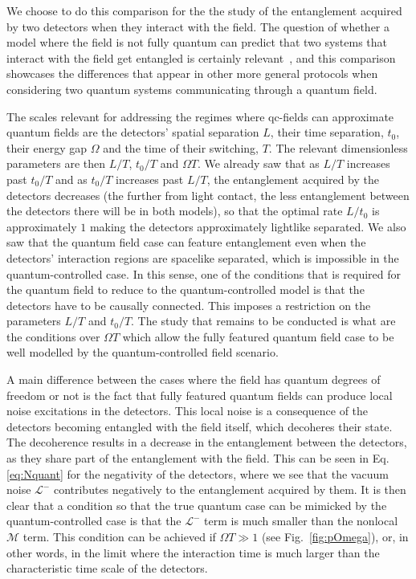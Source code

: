 \documentclass[letterpaper,12pt,titlepage,oneside,final]{book}
\begin{document}
We choose to do this comparison for the the study of the entanglement acquired by two detectors when they interact with the field. The question of whether a model where the field is not fully quantum can predict that two systems that interact with the field get entangled is certainly relevant~\cite{MVPRD2020}, and this comparison showcases the differences that appear in other more general protocols when considering two quantum systems communicating through a quantum field.


The scales relevant for addressing the regimes where qc-fields can approximate quantum fields are the detectors' spatial separation $L$, their time separation, $t_0$, their energy gap $\Omega$ and the time of their switching, $T$. The relevant dimensionless parameters are then $L/T$, $t_0/T$ and $\Omega T$. We already saw that as $L/T$ increases past $t_0/T$ and as $t_0/T$ increases past $L/T$, the entanglement acquired by the detectors decreases (the further from light contact, the less entanglement between the detectors there will be in both models), so that the optimal rate $L/t_0$ is approximately $1$ making the detectors approximately lightlike separated. We also saw that the quantum field case can feature entanglement even when the {detectors' interaction regions} are spacelike separated, which is impossible in the {quantum-controlled} case. {In this sense, one of the conditions that is required for the quantum field to reduce to {the quantum-controlled model} is that the detectors have to be causally connected}. This imposes a restriction on the parameters $L/T$ and $t_0/T$. The study that remains to be conducted is what are the conditions over $\Omega T$ which allow the {fully featured} quantum field case to be well modelled by the {quantum-controlled} field scenario.


A main difference between {the cases where the field has quantum degrees of freedom or not} is the fact that {fully featured} quantum fields can produce local noise excitations in the detectors. This local noise is a consequence of the detectors becoming entangled with the field itself, which decoheres their state. The decoherence results in a decrease in the entanglement between the detectors, as they share part of the entanglement with the field. This can be seen in Eq. \eqref{eq:Nquant} for the negativity of the detectors, where we see that the vacuum noise $\mathcal{L}^-$ contributes negatively to the entanglement acquired by them. It is then clear that a condition so that the {true} quantum case can be mimicked by the {quantum-controlled case} is that the $\mathcal{L}^-$ term is much smaller than the nonlocal $\mathcal{M}$ term. This condition can be achieved if $\Omega T\gg 1$ (see Fig.~\ref{fig:pOmega}), or, in other words, in the limit where the interaction time is much larger than the characteristic time scale of the detectors.
\end{document}
